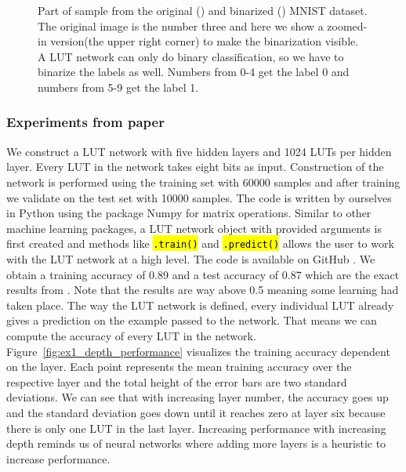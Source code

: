 \begin{figure}[!htb]
\begin{minipage}[b]{.48\linewidth}
      \label{fig:mnist_dataset_binarized}
  \end{minipage}
  \caption{Part of sample from the original () and binarized () MNIST dataset. The original image is the number three and here we show a zoomed-in version(the upper right corner) to make the binarization visible. A LUT network can only do binary classification, so we have to binarize the labels as well. Numbers from 0-4 get the label 0 and numbers from 5-9 get the label 1.}
\label{fig:mnist_dataset}
\end{figure}
\FloatBarrier

\subsubsection{Experiments from paper}
We construct a LUT network with five hidden layers and 1024 LUTs per hidden layer. Every LUT in the network takes eight bits as input. Construction of the network is performed using the training set with 60000 samples and after training we validate on the test set with 10000 samples. The code is written by ourselves in Python using the package Numpy \cite{bib:harris2020array} for matrix operations. Similar to other machine learning packages, a LUT network object with provided arguments is first created and methods like \hl{\texttt{.train()}} and \hl{\texttt{.predict()}} allows the user to work with the LUT network at a high level. The code is available on GitHub \cite{bib:lut_github}. We obtain a training accuracy of 0.89 and a test accuracy of 0.87 which are the exact results from \cite{bib:chatterjee2018learning}. Note that the results are way above 0.5 meaning some learning had taken place. The way the LUT network is defined, every individual LUT already gives a prediction on the example passed to the network. That means we can compute the accuracy of every LUT in the network. Figure~\ref{fig:ex1_depth_performance} visualizes the training accuracy dependent on the layer. Each point represents the mean training accuracy over the respective layer and the total height of the error bars are two standard deviations. We can see that with increasing layer number, the accuracy goes up and the standard deviation goes down until it reaches zero at layer six because there is only one LUT in the last layer. Increasing performance with increasing depth reminds us of neural networks where adding more layers is a heuristic to increase performance.

